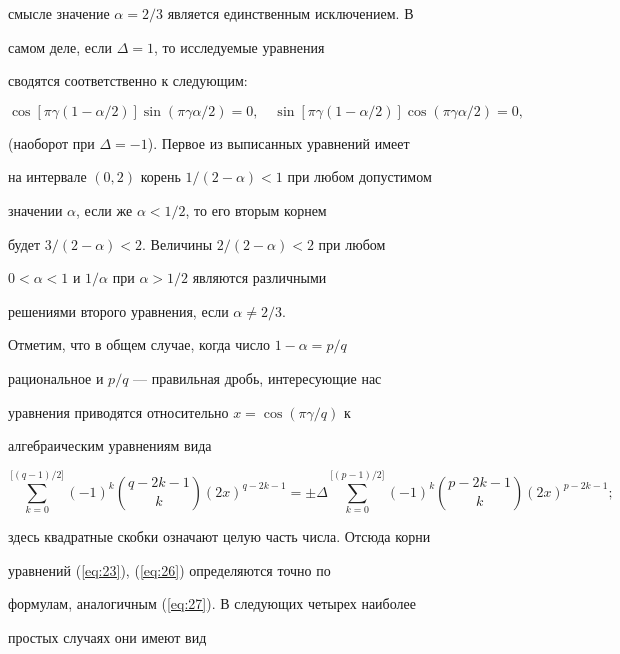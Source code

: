 смысле значение $\alpha=2/3$ является единственным исключением. В


самом деле, если $\Delta=1$, то исследуемые уравнения


сводятся соответственно к следующим:


$$


\cos[\pi\gamma(1-\alpha/2)]\sin(\pi\gamma\alpha/2)=0,\quad


\sin[\pi\gamma(1-\alpha/2)]\cos(\pi\gamma\alpha/2)=0,


$$


(наоборот при $\Delta=-1$). Первое из выписанных уравнений имеет


на интервале $(0,2)$ корень $1/(2-\alpha) <1$ при любом допустимом


значении $\alpha$, если же $\alpha<1/2$, то его вторым корнем


будет $3/(2-\alpha) <2$. Величины $2/(2-\alpha) <2$ при любом


$0<\alpha<1$ и $1/\alpha$ при $\alpha>1/2$ являются различными


решениями второго уравнения, если $\alpha\ne 2/3$.





Отметим, что в общем случае, когда число $1-\alpha=p/q$


рациональное и $p/q$ --- правильная дробь, интересующие нас


уравнения приводятся относительно $x=\cos (\pi\gamma/q)$ к


алгебраическим уравнениям вида


$$


\sum\limits_{k=0}^{{\boldsymbol [}(q-1)/2{\boldsymbol


]}} (-1)^k{q-2k-1 \choose k} (2x)^{q-2k-1}=\pm\Delta


\sum\limits_{k=0}^{{\boldsymbol [}(p-1)/2{\boldsymbol ]}} (-1)^k{p-2k-1


\choose k} (2x)^{p-2k-1};


$$


здесь квадратные скобки означают целую часть числа. Отсюда корни


уравнений (\ref{eq:23}), (\ref{eq:26}) определяются точно по


формулам, аналогичным (\ref{eq:27}). В следующих четырех наиболее


простых случаях они имеют вид


